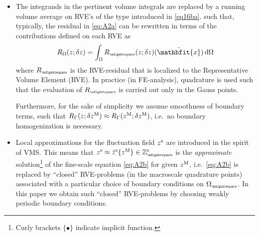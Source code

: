 \documentclass[12pt,a4paper]{article}
\renewcommand{\ta}[1]{\mathbfit{#1}}
\renewcommand{\Box}{\mdlgwhtsquare}
\DeclarePairedDelimiter{\homgen}{\langle}{\rangle_\rve}
\newcommand{\rve}{
  {\mathchoice
   {\mbox{\scalebox{0.67}{$\Box$}}}
   {\mbox{\scalebox{0.67}{$\Box$}}}
   {\mbox{\scalebox{0.5}{$\Box$}}}
   {\mbox{\scalebox{0.375}{$\Box$}}}
  }
}
\begin{document}
\begin{itemize}
\item The integrands in the pertinent volume integrals are replaced by a running volume average on RVE's of the type introduced in \cref{eq16ba}.
such that, typically, the residual in \cref{eq:A2a} can be rewritten in terms of the contributions defined on each RVE as
\begin{align}
\label{eq:A106} R_\Omega(z;\delta z) = \int_\Omega R_\rve(z;\delta z)(\bar{\ta x})\dif\Omega
\end{align}
where $R_\rve$ is the RVE-residual that is localized to the Representative Volume Element (RVE).
In practice (in FE-analysis), quadrature is used such that the evaluation of $R_\rve$ is carried out only in the Gauss points.

Furthermore, for the sake of simplicity we assume smoothness of boundary terms, such that $R_\Gamma(z; \delta z^{\mathrm{M}}) \approx R_\Gamma(z^{\mathrm{M}};\delta z^{\mathrm{M}})$, i.e.\ no boundary homogenization is necessary.

\item Local approximations for the fluctuation field $z^{\mathrm{s}}$ are introduced in the spirit of VMS.
This means that $z^\fluct \approx \tilde{z}^\fluct\{z^\macro\}\in\set{Z}_\rve^{\fluct}$ is the \emph{approximate} solution\footnote{Curly brackets $\{\bullet\}$ indicate implicit function.} of the fine-scale 
equation \cref{eq:A2b} for given $z^{\mathrm{M}}$, i.e.\ \cref{eq:A2b} is replaced by ``closed'' RVE-problems (in the macroscale quadrature points) associated with a particular choice of boundary conditions on $\Omega_\rve$.
In this paper we obtain such ``closed'' RVE-problems by choosing  weakly periodic boundary conditions.
\end{itemize}
\end{document}

